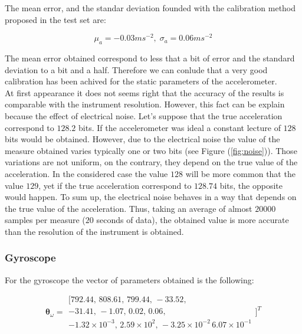 \documentclass[conference]{IEEEtran}
\newcommand{\refp}[1]{(\ref{#1})}
\begin{document}
The mean error, and the standar deviation founded with the calibration method proposed in the test set are:

\begin{equation}
\mu_a = -0.03ms^{-2}, \; \sigma_a = 0.06ms^{-2}
\end{equation}

The mean error obtained correspond to less that a bit of error and the standard deviation to a bit and a half. Therefore we can conlude that a very good calibration has been achived for the static parameters of the accelerometer.\\

At first appearance it does not seems right that the accuracy of the results is comparable with the instrument resolution. However, this fact can be explain because the effect of electrical noise. Let's suppose that the true acceleration correspond to $128.2$ bits. If the accelerometer was ideal a constant lecture of $128$ bits would be obtained. However, due to the electrical noise the value of the measure obtained varies typically one or two bits (see Figure \refp{fig:noise}). Those variations are not uniform, on the contrary, they depend on the true value of the acceleration. In the considered case the value $128$ will be more common that the value $129$, yet if the true acceleration correspond to $128.74$ bits, the opposite would happen. To sum up, the electrical noise behaves in a way that depends on the true value of the acceleration. Thus, taking an average of almost $20000$ samples per measure ($20$ seconds of data), the obtained value is more accurate than the resolution of the instrument is obtained. \\


\subsubsection{Gyroscope}
For the gyroscope the vector of parameters obtained is the following:

\begin{equation}
\boldsymbol{\theta}_\omega = \begin{array}{c}
[792.44,\, 808.61, \, 799.44, \, -33.52,  \\
-31.41, \, -1.07, \, 0.02, \, 0.06, \\
 -1.32 \times 10^{-3}, \,  2.59\times 10^{2}, \,  -3.25 \times 10^{-2} \, 6.07\times 10^{-1}
 \end{array}]^T
\end{equation}
\end{document}
